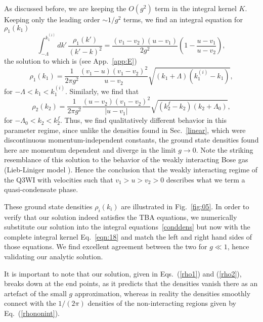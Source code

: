\documentclass[aps,pra,
superscriptaddress,
reprint,twocolumn,preprintnumbers,
amsmath,amssymb,
nofootinbib]{revtex4-1}
\def\rf#1{(\ref{#1})}
\begin{document}
As discussed before, we are keeping the $O(g^2)$ term in the integral kernel $K$. Keeping only the leading order $\sim 1/g^2$ terms, we find an integral equation for $\rho_1(k_1)$
        \begin{equation}
        \label{eqn:129}
        \int_{-\Lambda}^{k_1^{(i)}} dk'\,\frac{\rho_1(k')}{(k' - k)^2} = \frac{(v_1 - v_2)(u - v_1)}{2 g^2} \left(1 - \frac{u - v_1}{u - v_2} \right),
        \end{equation}
the solution to which is (see App.~\ref{app:E})
        \begin{equation}
        \label{rho1}
        \rho_1(k_1) = \frac{1}{2\pi g^2}\frac{(v_1 - u)(v_1 - v_2)^2}{u - v_2} \sqrt{(k_1 + \Lambda)(k_1^{(i)} - k_1)},
        \end{equation}
for $-\Lambda<k_1<k_1^{(i)}$. Similarly, we find that
        \begin{equation}
        \label{rho2}
        \rho_2(k_2) = \frac{1}{2\pi g^2}\frac{(u - v_2)(v_1 - v_2)^2}{|u - v_1|} \sqrt{(k_2^f - k_2)(k_2 + \Lambda_0)},
        \end{equation}
for $-\Lambda_0<k_2<k_2^f$. Thus, we find qualitatively different behavior in this parameter regime, since unlike the densities found in Sec.~\ref{linear}, which were discontinuous momentum-independent constants, the ground state densities found here are momentum dependent and diverge in the limit $g\to 0$. Note the striking resemblance of this solution to the behavior of the weakly interacting Bose gas (Lieb-Liniger model \cite{LiebLiniger}). Hence the conclusion that  the weakly interacting regime of the Q3WI with velocities such that $v_1>u>v_2>0$ describes what we term a quasi-condensate phase. 

These ground state densities $\rho_i(k_i)$ are illustrated in Fig.~\ref{fig:05}. In order to verify that our solution indeed satisfies the TBA equations, we numerically substitute our solution into the integral equations~\eqref{conddens} but now with the complete integral kernel Eq.~\eqref{eqn:18} and match the left and right hand sides of those equations. We find excellent agreement between the two for $g\ll 1$, hence validating our analytic solution. 
   
It is important to note that our solution, given in Eqs.~\rf{rho1} and \rf{rho2}, breaks down at the end points, as it predicts that the densities vanish there as an artefact of the small $g$ approximation, whereas in reality the densities smoothly connect with the $1/(2\pi)$ densities of the non-interacting regions given by Eq.~\rf{rhononint}.
\end{document}

